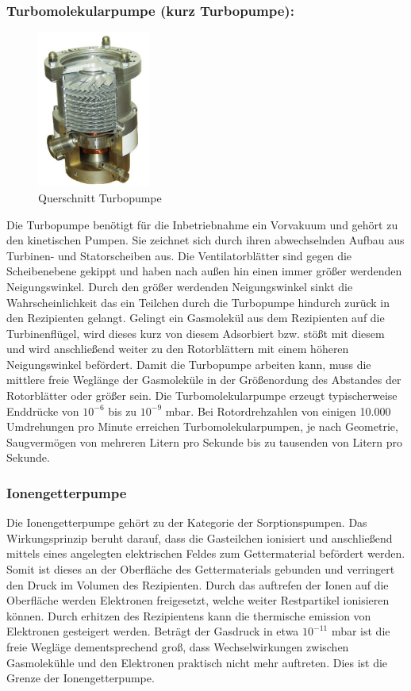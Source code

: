 \subsubsection{Turbomolekularpumpe (kurz Turbopumpe):}
\begin{figure}
    \vspace{-1cm}
    \centering
    \includegraphics[width=0.33\textwidth]{./picture/Turbo.jpg}
    \caption{Querschnitt Turbopumpe \cite{Turbo}}
    \label{fig:Turbo}
    \vspace{-0.5cm}
\end{figure}
Die Turbopumpe benötigt für die Inbetriebnahme ein Vorvakuum und gehört zu den kinetischen Pumpen. Sie zeichnet sich durch ihren abwechselnden Aufbau aus Turbinen-  und Statorscheiben aus. Die Ventilatorblätter sind gegen die Scheibenebene gekippt und haben nach außen hin einen immer größer werdenden Neigungswinkel. Durch den größer werdenden Neigungswinkel sinkt die Wahrscheinlichkeit das ein Teilchen durch die Turbopumpe hindurch zurück in den Rezipienten gelangt. Gelingt ein Gasmolekül aus dem Rezipienten auf die Turbinenflügel, wird dieses kurz von diesem Adsorbiert bzw. stößt mit diesem und wird anschließend weiter zu den Rotorblättern mit einem höheren Neigungswinkel befördert. Damit die Turbopumpe arbeiten kann, muss die mittlere freie Weglänge der Gasmoleküle in der Größenordung des Abstandes der Rotorblätter oder größer sein. Die Turbomolekularpumpe erzeugt typischerweise Enddrücke von $10^{-6}$ bis zu $10^{-9}$ mbar. Bei Rotordrehzahlen von einigen 10.000 Umdrehungen pro Minute erreichen Turbomolekularpumpen, je nach Geometrie, Saugvermögen von mehreren Litern pro Sekunde bis zu tausenden von Litern pro Sekunde.

\subsubsection{Ionengetterpumpe}
Die Ionengetterpumpe gehört zu der Kategorie der Sorptionspumpen. Das Wirkungsprinzip beruht darauf, dass die Gasteilchen ionisiert und anschließend mittels eines angelegten elektrischen Feldes zum Gettermaterial befördert werden. Somit ist dieses an der Oberfläche des Gettermaterials gebunden und verringert den Druck im Volumen des Rezipienten. Durch das auftrefen der Ionen auf die Oberfläche werden Elektronen freigesetzt, welche weiter Restpartikel ionisieren können. Durch erhitzen des Rezipientens kann die thermische emission von Elektronen gesteigert werden. Beträgt der Gasdruck in etwa $10^{-11}$ mbar ist die freie Wegläge dementsprechend groß, dass Wechselwirkungen zwischen Gasmolekühle und den Elektronen praktisch nicht mehr auftreten. Dies ist die Grenze der Ionengetterpumpe.
